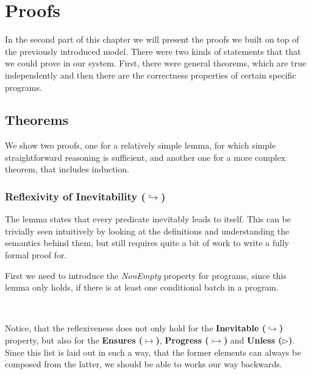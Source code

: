 \section{Proofs}

In the second part of this chapter we will present the proofs we built on top of the previously introduced model. There were two kinds of statements that that we could prove in our system. First, there were general theorems, which are true independently and then there are the correctness properties of certain specific programs.

\subsection{Theorems}

We show two proofs, one for a relatively simple lemma, for which simple straightforward reasoning is sufficient, and another one for a more complex theorem, that includes induction.

\subsubsection{Reflexivity of Inevitability ($\hookrightarrow$)}

The lemma states that every predicate inevitably leads to itself. This can be trivially seen intuitively by looking at the definitions and understanding the semantics behind them, but still requires quite a bit of work to write a fully formal proof for. 

First we need to introduce the \textit{NonEmpty} property for programs, since this lemma only holds, if there is at least one conditional batch in a program.

\begin{code}
    \>[2]\AgdaSpace{}%
    \AgdaSymbol{:}\AgdaSpace{}%
    \AgdaSpace{}%
    \AgdaSpace{}%
    \<%
    \\
    \>[2]\AgdaSpace{}%
    \AgdaSpace{}%
    \AgdaSymbol{=}\AgdaSpace{}%
    \AgdaSpace{}%
    \AgdaSymbol{(}\AgdaSpace{}%
    \AgdaSpace{}%
    \AgdaInductiveConstructor{[]}\AgdaSymbol{)}\<%
\end{code}

Notice, that the reflexiveness does not only hold for the \textbf{Inevitable ($\hookrightarrow$)} property, but also for the \textbf{Ensures ($\mapsto$)}, \textbf{Progress ($\rightarrowtail$)} and \textbf{Unless ($\rhd$)}. Since this list is laid out in such a way, that the former elements can always be composed from the latter, we should be able to works our way backwards.

